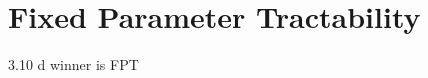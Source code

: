 \section{Fixed Parameter Tractability}\label{sec:fpt}

\begin{proposition}{3.10 d winner is FPT}
\end{proposition}